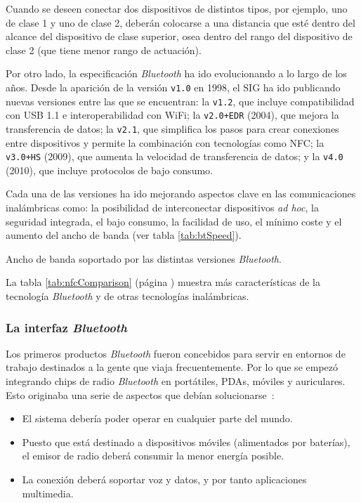 Cuando se deseen conectar dos dispositivos de distintos tipos, por ejemplo,
uno de clase 1 y uno de clase 2, deberán colocarse a una distancia que esté
dentro del alcance del dispositivo de clase superior, osea dentro del
rango del dispositivo de clase 2 (que tiene menor rango de actuación).

Por otro lado, la especificación \emph{Bluetooth} ha ido evolucionando a lo
largo de los años. Desde la aparición de la versión \texttt{v1.0} en 1998,
el \acs{SIG} ha ido publicando nuevas versiones entre las que se encuentran:
la \texttt{v1.2}, que incluye compatibilidad con \acs{USB} 1.1 e 
interoperabilidad con \acs{WiFi}; la \texttt{v2.0+EDR} (2004), que mejora la 
transferencia de datos; la \texttt{v2.1}, que simplifica los pasos para crear 
conexiones entre dispositivos y permite la combinación con tecnologías como
\acs{NFC}; la \texttt{v3.0+HS} (2009), que aumenta la velocidad de
transferencia de datos; y la \texttt{v4.0} (2010), que incluye protocolos de
bajo consumo.

Cada una de las versiones ha ido mejorando aspectos clave en las comunicaciones
inalámbricas como: la posibilidad de interconectar dispositivos \emph{ad hoc},
la seguridad integrada, el bajo consumo, la facilidad de uso, el mínimo coste
y el aumento del ancho de banda (ver tabla \ref{tab:btSpeed}).

\begin{table}[H]
  \centering
  \caption[Ancho de banda soportado por las distintas versiones
  \emph{Bluetooth}.]
  {Ancho de banda soportado por las distintas versiones \emph{Bluetooth}.}
  \label{tab:btSpeed}
  {\normalsize
  
  }
\end{table}

La tabla \ref{tab:nfcComparison} (página \pageref{tab:nfcComparison}) muestra
más características de la tecnología \emph{Bluetooth} y de otras tecnologías
inalámbricas.

  \subsubsection{La interfaz \emph{Bluetooth}}
Los primeros productos \emph{Bluetooth} fueron concebidos para servir en
entornos de trabajo destinados a la gente que viaja frecuentemente. Por lo
que se empezó integrando chips de radio \emph{Bluetooth} en portátiles,
\acs{PDA}s, móviles y auriculares. Esto originaba una serie de aspectos que
debían solucionarse~\cite{bib:btInterface}:
\begin{itemize}
\item El sistema debería poder operar en cualquier parte del mundo.
\item Puesto que está destinado a dispositivos móviles (alimentados por
baterías), el emisor de radio deberá consumir la menor energía posible.
\item La conexión deberá soportar voz y datos, y por tanto aplicaciones
multimedia.
\end{itemize}

